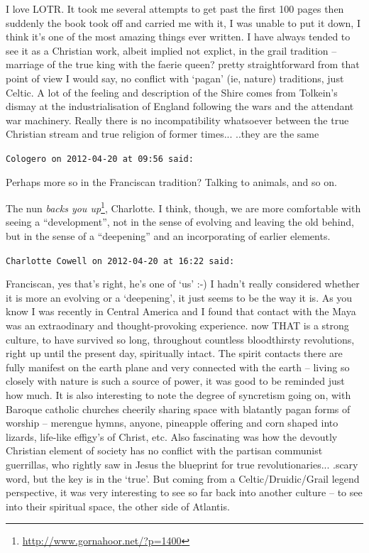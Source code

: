 \begin{footnotesize}
\begin{sffamily}
I love LOTR. It took me several attempts to get past the first 100 pages then suddenly the book took off and carried me with it, I was unable to put it down, I think it's one of the most amazing things ever written. I have always tended to see it as a Christian work, albeit implied not explict, in the grail tradition -- marriage of the true king with the faerie queen? pretty straightforward from that point of view I would say, no conflict with `pagan' (ie, nature) traditions, just Celtic. A lot of the feeling and description of the Shire comes from Tolkein's dismay at the industrialisation of England following the wars and the attendant war machinery. Really there is no incompatibility whatsoever between the true Christian stream and true religion of former times... ..they are the same

\hfill

\texttt{Cologero on 2012-04-20 at 09:56 said:}

Perhaps more so in the Franciscan tradition? Talking to animals, and so on.

The nun \textit{backs you up}\footnote{\url{http://www.gornahoor.net/?p=1400}}, Charlotte. I think, though, we are more comfortable with seeing a ``development'', not in the sense of evolving and leaving the old behind, but in the sense of a ``deepening'' and an incorporating of earlier elements.

\hfill

\texttt{Charlotte Cowell on 2012-04-20 at 16:22 said:}

Franciscan, yes that's right, he's one of `us' :-) I hadn't really considered whether it is more an evolving or a `deepening', it just seems to be the way it is. As you know I was recently in Central America and I found that contact with the Maya was an extraodinary and thought-provoking experience. now THAT is a strong culture, to have survived so long, throughout countless bloodthirsty revolutions, right up until the present day, spiritually intact. The spirit contacts there are fully manifest on the earth plane and very connected with the earth -- living so closely with nature is such a source of power, it was good to be reminded just how much. It is also interesting to note the degree of syncretism going on, with Baroque catholic churches cheerily sharing space with blatantly pagan forms of worship -- merengue hymns, anyone, pineapple offering and corn shaped into lizards, life-like effigy's of Christ, etc. Also fascinating was how the devoutly Christian element of society has no conflict with the partisan communist guerrillas, who rightly saw in Jesus the blueprint for true revolutionaries... .scary word, but the key is in the `true'. But coming from a Celtic/Druidic/Grail legend perspective, it was very interesting to see so far back into another culture -- to see into their spiritual space, the other side of Atlantis.


\end{sffamily}
\end{footnotesize}
